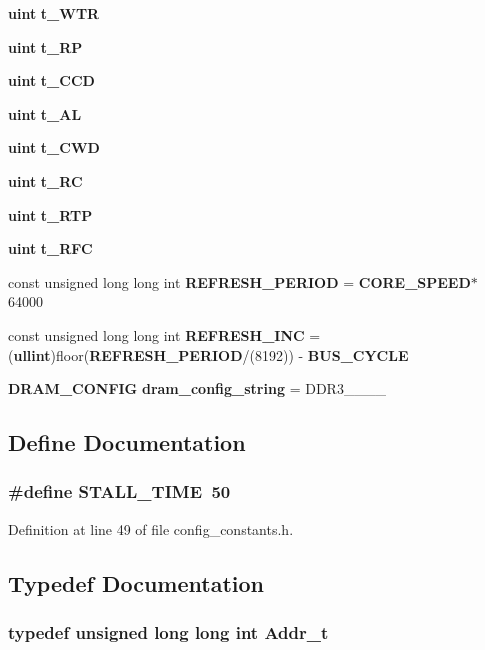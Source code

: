 \begin{CompactItemize}
{\bf uint} {\bf t\_\-WTR}
\item 
{\bf uint} {\bf t\_\-RP}
\item 
{\bf uint} {\bf t\_\-CCD}
\item 
{\bf uint} {\bf t\_\-AL}
\item 
{\bf uint} {\bf t\_\-CWD}
\item 
{\bf uint} {\bf t\_\-RC}
\item 
{\bf uint} {\bf t\_\-RTP}
\item 
{\bf uint} {\bf t\_\-RFC}
\item 
const unsigned long long int {\bf REFRESH\_\-PERIOD} = {\bf CORE\_\-SPEED}$\ast$64000
\item 
const unsigned long long int {\bf REFRESH\_\-INC} = ({\bf ullint})floor({\bf REFRESH\_\-PERIOD}/(8192)) - {\bf BUS\_\-CYCLE}
\item 
{\bf DRAM\_\-CONFIG} {\bf dram\_\-config\_\-string} = DDR3\_\_\_\_
\end{CompactItemize}


\subsection{Define Documentation}
\subsubsection[{STALL\_\-TIME}]{\setlength{\rightskip}{0pt plus 5cm}\#define STALL\_\-TIME~50}\label{config__constants_8h_a7157d228b08e0908de40a3a7cc280a8}




Definition at line 49 of file config\_\-constants.h.

\subsection{Typedef Documentation}
\subsubsection[{Addr\_\-t}]{\setlength{\rightskip}{0pt plus 5cm}typedef unsigned long long int {\bf Addr\_\-t}}\label{config__constants_8h_51badf0ffa6471a1e529c69852e56f57}




